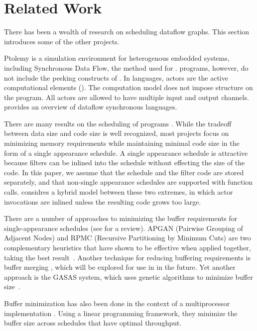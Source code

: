 \section{Related Work}
\label{chpt:related}

There has been a wealth of research on scheduling dataflow graphs.
This section introduces some of the other projects.

Ptolemy \cite{ptolemyoverview} is a simulation environment for
heterogenous embedded systems, including Synchronous Data Flow, the
method used for {\StreamIt}. {\SDF} programs, however, do not include
the peeking constructs of {\StreamIt}.  In {\SDF} languages, actors
are the active computational elements ({\filters}).  The {\SDF}
computation model does not impose structure on the program.  All
actors are allowed to have multiple input and output channels.
\cite{benveniste93dataflow} provides an overview of dataflow
synchronous languages.

There are many results on the scheduling of {\SDF} programs
\cite{leesdf,bhattacharyya99synthesis}.  While the tradeoff between
data size and code size is well recognized, most projects focus on
minimizing memory requirements while maintaining minimal code size in
the form of a single appearance schedule.  A single appearance
schedule is attractive because filters can be inlined into the
schedule without effecting the size of the code.  In this paper, we
assume that the schedule and the filter code are stored separately,
and that non-single appearance schedules are supported with function
calls. \cite{bhat1999x1} considres a hybrid model between these two
extremes, in which actor invocations are inlined unless the resulting
code grows too large.

There are a number of approaches to minimizing the buffer requirements
for single-appearance schedules (see \cite{bhattacharyya99synthesis}
for a review).  APGAN (Pairwise Grouping of Adjacent Nodes) and RPMC
(Recursive Partitioning by Minimum Cuts) are two complementary
heuristics that have shown to be effective when applied together,
taking the best result~\cite{Bhatta97}.  Another technique for
reducing buffering requirements is buffer merging
\cite{murthy99buffer,murt1999x3}, which will be explored for use in
{\StreamIt} in the future.  Yet another approach is the GASAS system,
which uses genetic algorithms to minimize buffer size~\cite{GASAS}.

Buffer minimization has also been done in the context of a
multiprocessor implementation \cite{govindarajan-minimizing}. Using a
linear programming framework, they minimize the buffer size across
schedules that have optimal throughput.

